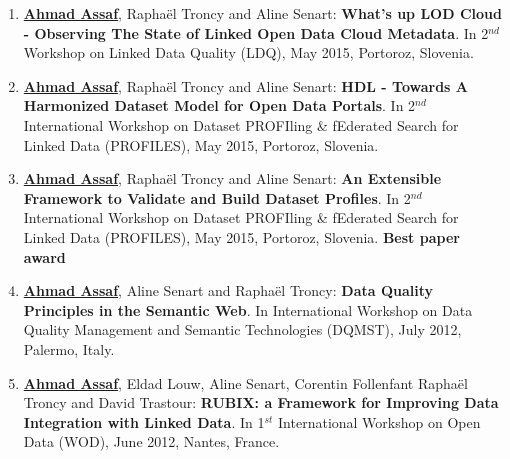 \begin{enumerate}
\item \underline{\textbf{Ahmad Assaf}}, {R}apha{\"e}l {T}roncy and {A}line {S}enart: \textbf{{W}hat's up {LOD} Cloud - Observing The State of Linked Open Data Cloud Metadata}. In 2$^{nd}$ Workshop on Linked Data Quality (LDQ), May 2015, {P}ortoroz, {S}lovenia.
\item \underline{\textbf{Ahmad Assaf}}, {R}apha{\"e}l {T}roncy and {A}line {S}enart: \textbf{{HDL} - Towards A Harmonized Dataset Model for Open Data Portals}. In 2$^{nd}$ {I}nternational {W}orkshop on {D}ataset {PROFI}ling \& f{E}derated {S}earch for {L}inked {D}ata (PROFILES), May 2015, {P}ortoroz, {S}lovenia.
\item \underline{\textbf{Ahmad Assaf}}, {R}apha{\"e}l {T}roncy and {A}line {S}enart: \textbf{{A}n Extensible Framework to Validate and Build Dataset Profiles}. In 2$^{nd}$ {I}nternational {W}orkshop on {D}ataset {PROFI}ling \& f{E}derated {S}earch for {L}inked {D}ata (PROFILES), May 2015, {P}ortoroz, {S}lovenia. \textbf{Best paper award}
\item \underline{\textbf{Ahmad Assaf}}, {A}line {S}enart and {R}apha{\"e}l {T}roncy: \textbf{{D}ata Quality Principles in the Semantic Web}. In International Workshop on Data Quality Management and Semantic Technologies (DQMST), July 2012, {P}alermo, {I}taly.
\item \underline{\textbf{Ahmad Assaf}}, {E}ldad {L}ouw, {A}line {S}enart, {C}orentin {F}ollenfant {R}apha{\"e}l {T}roncy and {D}avid {T}rastour: \textbf{{RUBIX}: a Framework for Improving Data Integration with Linked Data}. In 1$^{st}$ International Workshop on Open Data (WOD), June 2012, {N}antes, {F}rance.
\end{enumerate} 